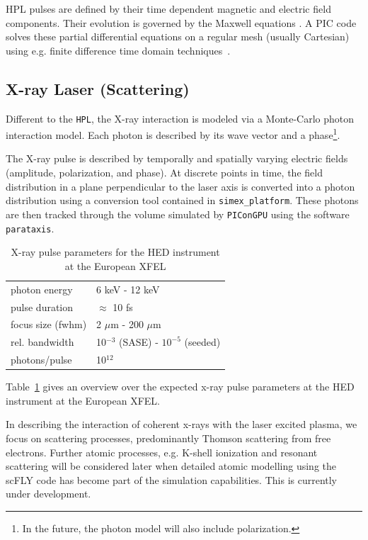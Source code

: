 \documentclass[12pt]{scrartcl}
\begin{document}
HPL pulses are defined by their time dependent
magnetic and electric field components. Their evolution is governed by the
Maxwell equations \cite{Jackson1975}. A PIC code solves these partial differential
equations on a regular mesh (usually
Cartesian) using e.g. finite difference time domain techniques~\cite{Yee1966}.

\subsection{X-ray Laser (Scattering)}

Different to the \texttt{HPL}, the X-ray interaction is modeled via a
Monte-Carlo photon interaction model. Each photon is described by its wave
vector and a phase\footnote{In the future, the photon model will also include
polarization.}.

The X-ray pulse is described by temporally and spatially varying electric fields
(amplitude, polarization, and phase). At discrete points in time, the field
distribution in a plane perpendicular to the laser axis is converted into a
photon distribution using a conversion tool contained in
\texttt{simex\_platform}. These photons are then tracked through the volume simulated by
\texttt{PIConGPU} using the software \texttt{parataxis}.
\begin{table}[h]
  \centering
  \begin{tabular}{|l|l|}
    \hline
    photon energy &  6 keV - 12 keV \\
    pulse duration & $\approx$ 10 fs \\
    focus size (fwhm) & 2 $\mu\text{m}$ - 200 $\mu\text{m}$\\
    rel. bandwidth & 10$^{-3}$ (SASE) - $10^{-5}$ (seeded)\\
    photons/pulse & 10$^{12}$\\
    \hline
  \end{tabular}
  \caption{X-ray pulse parameters for the HED instrument at the European XFEL}
  \label{tab:xfel_sase2}
\end{table}
Table~\ref{tab:xfel_sase2} gives an overview over the expected x-ray pulse
parameters at the HED instrument at the European XFEL.

In describing the interaction of coherent x-rays with the laser excited plasma,
we focus on scattering processes, predominantly Thomson scattering from free
electrons. Further atomic processes, e.g. K-shell ionization and resonant
scattering will be considered later when detailed atomic modelling using the
scFLY code \cite{Chung2007} has become part of the simulation capabilities. This is
currently under development.
\end{document}
